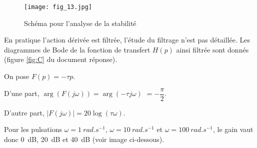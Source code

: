 \ifprof
\else

\begin{figure}[H]
\centering
\texttt{[image: fig\_13.jpg]}
\caption{\label{fig:13} Schéma pour l'analyse de la stabilité}
\end{figure}

En pratique l'action dérivée est filtrée, l'étude du filtrage n'est pas détaillée. Les diagrammes de Bode de la fonction de transfert $H(p)$ ainsi filtrée sont donnés (figure \ref{fig:C} du document réponse). 
\fi

\ifprof
\begin{corrige}
On pose $F(p) = -\tau p$. 

D'une part, 
$\arg\left(F\left(j\omega\right)\right) =\arg\left(-\tau j\omega \right)$ $=-\dfrac{\pi}{2}$.

D'autre part, 
$\left|F\left(j\omega\right)\right| =20\log\left( \tau\omega\right)$.

Pour les pulsations 
$\omega=\SI{1}{rad.s^{-1}}$, $\omega=\SI{10}{rad.s^{-1}}$ et $\omega=\SI{100}{rad.s^{-1}}$, le gain vaut donc \SI{0}{dB}, \SI{20}{dB} et \SI{40}{dB} (voir image ci-dessous).

\begin{center}
\end{center}

\end{corrige}
\else
\fi

